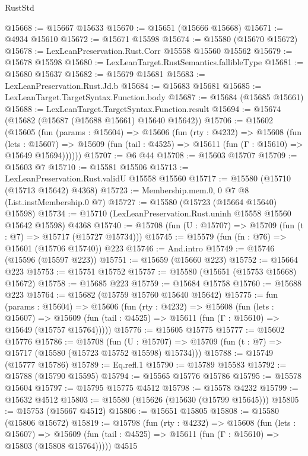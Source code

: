 \begin{lexlean}{RustStd}
\begin{coremodule}
@15668 := @15667 @15633
@15670 := @15651 (@15666 @15668)
@15671 := @4934 @15610
@15672 := @15671 @15598
@15674 := @15580 (@15670 @15672)
@15678 := LexLeanPreservation.Rust.Corr @15558 @15560 @15562
@15679 := @15678 @15598
@15680 := LexLeanTarget.RustSemantics.fallibleType
@15681 := @15680 @15637
@15682 := @15679 @15681
@15683 := LexLeanPreservation.Rust.Jd.b
@15684 := @15683 @15681
@15685 := LexLeanTarget.TargetSyntax.Function.body
@15687 := @15684 (@15685 @15661)
@15688 := LexLeanTarget.TargetSyntax.Function.result
@15694 := @15674 (@15682 (@15687 (@15688 @15661) @15640 @15642))
@15706 := @15602
    (@15605
      (fun (params : @15604) =>
      @15606
        (fun (rty : @4232) =>
        @15608
          (fun (lets : @15607) =>
          @15609 (fun (tail : @4525) => @15611 (fun (Γ : @15610) => @15649 @15694))))))
@15707 := @6 @44
@15708 := @15603 @15707
@15709 := @15603 @7
@15710 := @15581 @15506
@15713 := LexLeanPreservation.Rust.validU @15558 @15560
@15717 := @15580 (@15710 (@15713 @15642) @4368)
@15723 := Membership.mem.{0, 0} @7 @8 (List.instMembership.{0} @7)
@15727 := @15580 (@15723 (@15664 @15640) @15598)
@15734 := @15710 (LexLeanPreservation.Rust.uninh @15558 @15560 @15642 @15598) @4368
@15740 := @15708 (fun (U : @15707) => @15709 (fun (t : @7) => @15717 (@15727 @15734)))
@15745 := @15579 (fun (fn : @76) => @15601 (@15706 @15740)) @223
@15746 := And.intro
@15749 := @15746 (@15596 (@15597 @223))
@15751 := @15659 (@15660 @223)
@15752 := @15664 @223
@15753 := @15751 @15752
@15757 := @15580 (@15651 (@15753 @15668) @15672)
@15758 := @15685 @223
@15759 := @15684 @15758
@15760 := @15688 @223
@15764 := @15682 (@15759 @15760 @15640 @15642)
@15775 := fun (params : @15604) =>
  @15606
    (fun (rty : @4232) =>
    @15608
      (fun (lets : @15607) =>
      @15609 (fun (tail : @4525) => @15611 (fun (Γ : @15610) => @15649 (@15757 @15764)))))
@15776 := @15605 @15775
@15777 := @15602 @15776
@15786 := @15708
    (fun (U : @15707) => @15709 (fun (t : @7) => @15717 (@15580 (@15723 @15752 @15598) @15734)))
@15788 := @15749 (@15777 @15786)
@15789 := Eq.refl.{1}
@15790 := @15789 @15583
@15792 := @15788 (@15790 @15595)
@15794 := @15565 @15776 @15786
@15795 := @15578 @15604
@15797 := @15795 @15775 @4512
@15798 := @15578 @4232
@15799 := @15632 @4512
@15803 := @15580 (@15626 (@15630 (@15799 @15645)))
@15805 := @15753 (@15667 @4512)
@15806 := @15651 @15805
@15808 := @15580 (@15806 @15672)
@15819 := @15798
    (fun (rty : @4232) =>
    @15608
      (fun (lets : @15607) =>
      @15609 (fun (tail : @4525) => @15611 (fun (Γ : @15610) => @15803 (@15808 @15764)))))
    @4515

\end{coremodule}
\end{lexlean}
